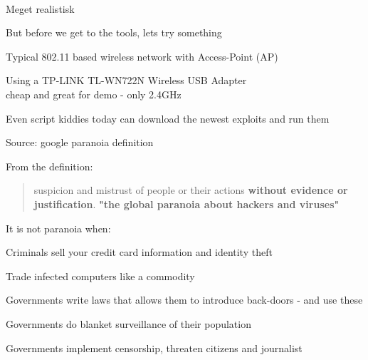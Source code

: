 \documentclass[20pt,landscape,a4paper,footrule]{foils}
\begin{document}



\\
Meget realistisk 


But before we get to the tools, lets try something



\begin{list1}
\item Typical 802.11 based wireless network with Access-Point (AP)
\item Using a TP-LINK TL-WN722N Wireless USB Adapter\\
cheap and great for demo - only 2.4GHz
\end{list1}



Even script kiddies today can download the newest exploits and run them



Source: google paranoia definition


From the definition:
\begin{quote}
suspicion and mistrust of people or their actions {\bf without evidence or justification}.
\bf "the global paranoia about hackers and viruses"
\end{quote}

\begin{list1}
\item It is not paranoia when:
\begin{list2}
\item Criminals sell your credit card information and identity theft
\item Trade infected computers like a commodity
\item Governments write laws that allows them to introduce back-doors - and use these
\item Governments do blanket surveillance of their population
\item Governments implement censorship, threaten citizens and journalist
\end{list2}
\end{list1}
\end{document}
